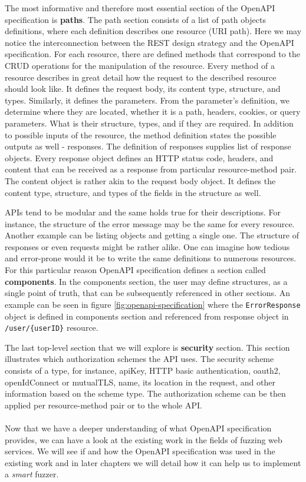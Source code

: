The most informative and therefore most essential section of the OpenAPI specification is \textbf{paths}. The path section consists of a list of path objects definitions, where each definition describes one resource (URI path). Here we may notice the interconnection between the REST design strategy and the OpenAPI specification. For each resource, there are defined methods that correspond to the CRUD operations for the manipulation of the resource. Every method of a resource describes in great detail how the request to the described resource should look like. It defines the request body, its content type, structure, and types. Similarly, it defines the parameters. From the parameter's definition, we determine where they are located, whether it is a path, headers, cookies, or query parameters. What is their structure, types, and if they are required. In addition to possible inputs of the resource, the method definition states the possible outputs as well - responses. The definition of responses supplies list of response objects. Every response object defines an HTTP status code, headers, and content that can be received as a response from particular resource-method pair. The content object is rather akin to the request body object. It defines the content type, structure, and types of the fields in the structure as well.

\label{subsec:components}
APIs tend to be modular and the same holds true for their descriptions. For instance, the structure of the error message may be the same for every resource. Another example can be listing objects and getting a single one. The structure of responses or even requests might be rather alike. One can imagine how tedious and error-prone would it be to write the same definitions to numerous resources. For this particular reason OpenAPI specification defines a section called \textbf{components}. In the components section, the user may define structures, as a single point of truth, that can be subsequently referenced in other sections. An example can be seen in figure \ref{fig:openapi-specification} where the \texttt{ErrorResponse} object is defined in components section and referenced from response object in \texttt{/user/\{userID\}} resource.

The last top-level section that we will explore is \textbf{security} section. This section illustrates which authorization schemes the API uses. The security scheme consists of a type, for instance, apiKey, HTTP basic authentication, oauth2, openIdConnect or mutualTLS, name, its location in the request, and other information based on the scheme type. The authorization scheme can be then applied per resource-method pair or to the whole API.


\paragraph{}
Now that we have a deeper understanding of what OpenAPI specification provides, we can have a look at the existing work in the fields of fuzzing web services. We will see if and how the OpenAPI specification was used in the existing work and in later chapters we will detail how it can help us to implement a \emph{smart} fuzzer.
